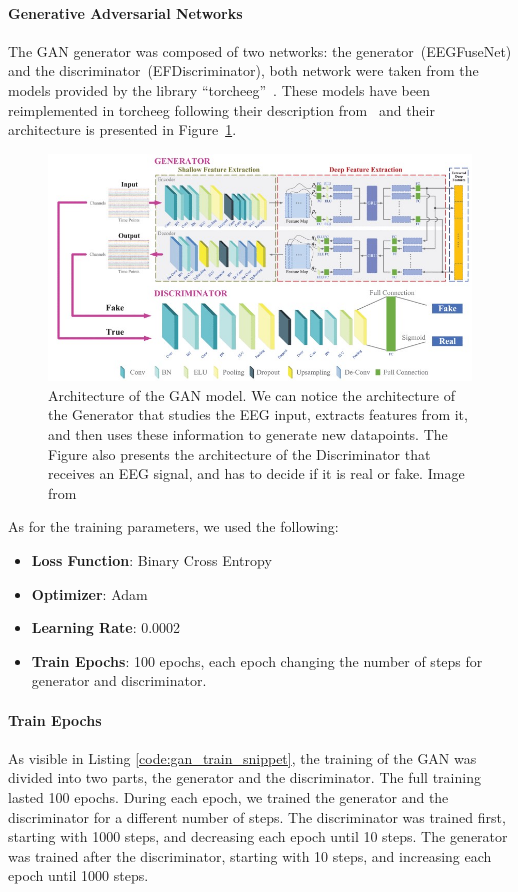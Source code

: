 \paragraph*{Generative Adversarial Networks}
The GAN generator was composed of two networks: the generator~(EEGFuseNet) and the discriminator~(EFDiscriminator), both network were taken from the models provided by the library ``torcheeg''~\cite{zhang2024torcheeg}.
These models have been reimplemented in torcheeg following their description from~\cite{liang2021eegfusenet} and their architecture is presented in Figure~\ref{fig:gan_paper}.
\begin{figure}[!htbp]
    \centering
    \includegraphics[width=\textwidth]{Figures/Methodology/GAN}
    \caption{Architecture of the GAN model. 
    We can notice the architecture of the Generator that studies the EEG input, extracts features from it, and then uses these information to generate new datapoints. 
    The Figure also presents the architecture of the Discriminator that receives an EEG signal, and has to decide if it is real or fake. Image from~\cite{liang2021eegfusenet}}\label{fig:gan_paper}
\end{figure}


As for the training parameters, we used the following:
\begin{itemize}
    \item \textbf{Loss Function}: Binary Cross Entropy
    \item \textbf{Optimizer}: Adam
    \item \textbf{Learning Rate}: 0.0002
    \item \textbf{Train Epochs}: 100 epochs, each epoch changing the number of steps for generator and discriminator.
\end{itemize}
\paragraph*{Train Epochs}
As visible in Listing \ref{code:gan_train_snippet}, the training of the GAN was divided into two parts, the generator and the discriminator.
The full training lasted 100 epochs.
During each epoch, we trained the generator and the discriminator for a different number of steps.
The discriminator was trained first, starting with 1000 steps, and decreasing each epoch until 10 steps.
The generator was trained after the discriminator, starting with 10 steps, and increasing each epoch until 1000 steps.


